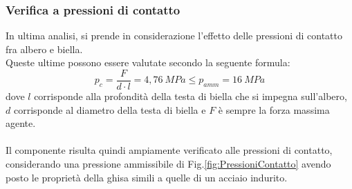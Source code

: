 \subsubsection{Verifica a pressioni di contatto}
In ultima analisi, si prende in considerazione l'effetto delle pressioni di contatto fra albero e biella.\\
Queste ultime possono essere valutate secondo la seguente formula:
\begin{equation}
    p_c=\frac{F}{d\cdot l}=4,76\ MPa\leq p_{amm}=16\ MPa
\end{equation}
dove $l$ corrisponde alla profondità della testa di biella che si impegna sull'albero, $d$ corrisponde al diametro della testa di biella e $F$ è sempre la forza massima agente.\\
\\
Il componente risulta quindi ampiamente verificato alle pressioni di contatto, considerando una pressione ammissibile di Fig.\ref{fig:PressioniContatto} avendo posto le proprietà della ghisa simili a quelle di un acciaio indurito.\\

